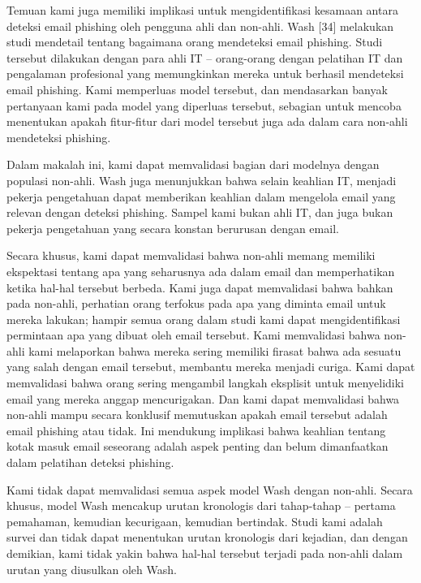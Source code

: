 \documentclass[lettersize,journal]{IEEEtran}
\begin{document}
Temuan kami juga memiliki implikasi untuk mengidentifikasi kesamaan antara
deteksi email phishing oleh pengguna ahli dan non-ahli. Wash [34] melakukan
studi mendetail tentang bagaimana orang mendeteksi email phishing. Studi
tersebut dilakukan dengan para ahli IT – orang-orang dengan pelatihan IT dan
pengalaman profesional yang memungkinkan mereka untuk berhasil mendeteksi email
phishing. Kami memperluas model tersebut, dan mendasarkan banyak pertanyaan
kami pada model yang diperluas tersebut, sebagian untuk mencoba menentukan
apakah fitur-fitur dari model tersebut juga ada dalam cara non-ahli mendeteksi
phishing.

Dalam makalah ini, kami dapat memvalidasi bagian dari modelnya dengan populasi
non-ahli. Wash juga menunjukkan bahwa selain keahlian IT, menjadi pekerja
pengetahuan dapat memberikan keahlian dalam mengelola email yang relevan dengan
deteksi phishing. Sampel kami bukan ahli IT, dan juga bukan pekerja pengetahuan
yang secara konstan berurusan dengan email.

Secara khusus, kami dapat memvalidasi bahwa non-ahli memang memiliki ekspektasi
tentang apa yang seharusnya ada dalam email dan memperhatikan ketika hal-hal
tersebut berbeda. Kami juga dapat memvalidasi bahwa bahkan pada non-ahli,
perhatian orang terfokus pada apa yang diminta email untuk mereka lakukan;
hampir semua orang dalam studi kami dapat mengidentifikasi permintaan apa yang
dibuat oleh email tersebut. Kami memvalidasi bahwa non-ahli kami melaporkan
bahwa mereka sering memiliki firasat bahwa ada sesuatu yang salah dengan email
tersebut, membantu mereka menjadi curiga. Kami dapat memvalidasi bahwa orang
sering mengambil langkah eksplisit untuk menyelidiki email yang mereka anggap
mencurigakan. Dan kami dapat memvalidasi bahwa non-ahli mampu secara konklusif
memutuskan apakah email tersebut adalah email phishing atau tidak. Ini
mendukung implikasi bahwa keahlian tentang kotak masuk email seseorang adalah
aspek penting dan belum dimanfaatkan dalam pelatihan deteksi phishing.

Kami tidak dapat memvalidasi semua aspek model Wash dengan non-ahli. Secara
khusus, model Wash mencakup urutan kronologis dari tahap-tahap – pertama
pemahaman, kemudian kecurigaan, kemudian bertindak. Studi kami adalah survei
dan tidak dapat menentukan urutan kronologis dari kejadian, dan dengan
demikian, kami tidak yakin bahwa hal-hal tersebut terjadi pada non-ahli dalam
urutan yang diusulkan oleh Wash.
\end{document}
